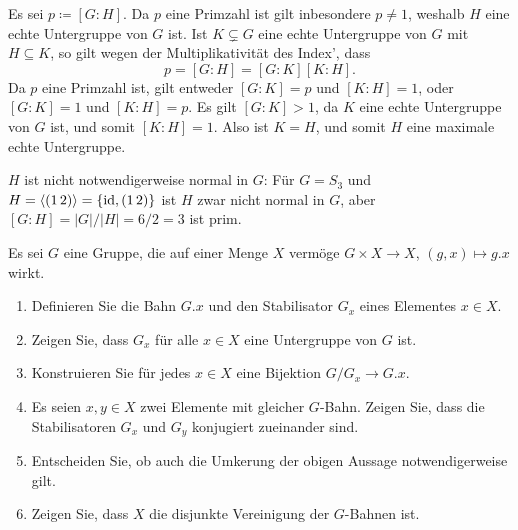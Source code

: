 \begin{solution}
  Es sei $p \coloneqq [G : H]$.
  Da $p$ eine Primzahl ist gilt inbesondere $p \neq 1$, weshalb $H$ eine echte Untergruppe von $G$ ist.
  Ist $K \subsetneq G$ eine echte Untergruppe von $G$ mit $H \subseteq K$, so gilt wegen der Multiplikativität des Index’, dass 
  \[
      p
    = [G : H]
    = [G : K] [K : H].
  \]
  Da $p$ eine Primzahl ist, gilt entweder $[G : K] = p$ und $[K : H] = 1$, oder $[G : K] = 1$ und $[K : H] = p$.
  Es gilt $[G : K] > 1$, da $K$ eine echte Untergruppe von $G$ ist, und somit $[K : H] = 1$.
  Also ist $K = H$, und somit $H$ eine maximale echte Untergruppe.
  
  $H$ ist nicht notwendigerweise normal in $G$:
  Für $G = S_3$ und $H = \langle(1\,2)\rangle = \{\operatorname{id}, (1\,2)\}$ ist $H$ zwar nicht normal in $G$, aber $[G : H] = |G|/|H| = 6/2 = 3$ ist prim.
\end{solution}


\begin{question}[subtitle = Grundbegriffe der Gruppenwirkungen]
  Es sei $G$ eine Gruppe, die auf einer Menge $X$ vermöge $G \times X \to X$, $(g,x) \mapsto g.x$ wirkt.
  \begin{enumerate}
    \item
      Definieren Sie die Bahn $G.x$ und den Stabilisator $G_x$ eines Elementes $x \in X$.
    \item
      Zeigen Sie, dass $G_x$ für alle $x \in X$ eine Untergruppe von $G$ ist.
    \item
      Konstruieren Sie für jedes $x \in X$ eine Bijektion $G/G_x \to G.x$.
    \item
      Es seien $x, y \in X$ zwei Elemente mit gleicher $G$-Bahn.
      Zeigen Sie, dass die Stabilisatoren $G_x$ und $G_y$ konjugiert zueinander sind.
    \item
      Entscheiden Sie, ob auch die Umkerung der obigen Aussage notwendigerweise gilt.
    \item
      Zeigen Sie, dass $X$ die disjunkte Vereinigung der $G$-Bahnen ist.
  \end{enumerate}
\end{question}


